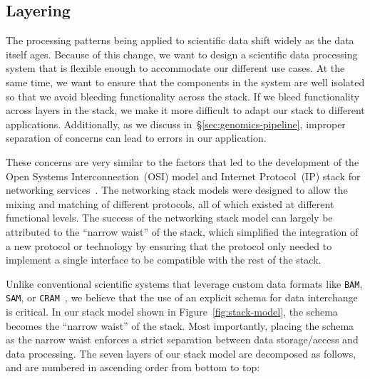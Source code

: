 \documentclass{acm_proc_article-sp}
\begin{document}
\subsection{Layering}
\label{sec:layering}

The processing patterns being applied to scientific data shift widely
as the data itself ages. Because of this change, we want to design a scientific data processing system that is
flexible enough to accommodate our different use cases. At the same time, we want to ensure that the
components in the system are well isolated so that we avoid bleeding functionality across the stack. If
we bleed functionality across layers in the stack, we make it more difficult to adapt our stack to different
applications. Additionally, as we discuss in~\S\ref{sec:genomics-pipeline}, improper separation of
concerns can lead to errors in our application.

These concerns are very similar to the factors that led to the development of the Open Systems
Interconnection~(OSI) model and Internet Protocol~(IP) stack for networking
services~\cite{zimmermann80}. The networking stack models were designed to allow the mixing and
matching of different protocols, all of which existed at different functional levels. The success of the
networking stack model can largely be attributed to the ``narrow waist'' of the stack, which simplified the
integration of a new protocol or technology by ensuring that the protocol only needed to implement a
single interface to be compatible with the rest of the stack.

Unlike conventional scientific systems that leverage custom data formats like \texttt{BAM}, \texttt{SAM},
or \texttt{CRAM}~\cite{fritz11, li09}, we believe that the use of an explicit schema for data interchange is critical.
In our stack model shown in Figure~\ref{fig:stack-model}, the schema becomes the ``narrow waist''
of the stack. Most importantly, placing the schema as the narrow waist enforces a strict separation
between data storage/access and data processing. The seven layers of our stack model
are decomposed as follows, and are numbered in ascending order from bottom to top:
\end{document}
